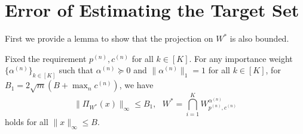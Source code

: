 \section{Error of Estimating the Target Set} 
First we provide a lemma to show that the projection on $W^*$ is also bounded. 
\begin{lemma}\label{lemma: bounded proj}
    Fixed the requirement $p^{(n)}, c^{(n)}$ for all $k \in [K]$. For  any importance weight $\{\alpha^{(n)}\}_{k \in [K]}$ such that $\alpha^{(n)}\succeq 0$ and $\|\alpha^{(n)}\|_1=1$ for all $k \in [K]$, for $B_1 = 2\sqrt{m}(B+\max_n c^{(n)})$, we have 
    $$\|\Pi_{W^*}(x)\|_\infty\le B_1, \ \ \ W^* = \bigcap_{i=1}^K W^{\alpha^{(n)}}_{p^{(n)},c^{(n)}}$$
    holds for all $\|x\|_\infty\le B.$
\end{lemma}

